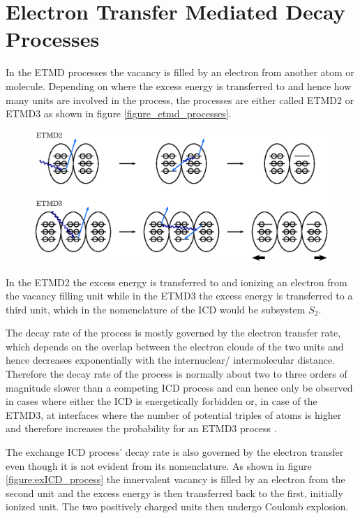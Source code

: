 \section{Electron Transfer Mediated Decay Processes}
In the \ac{ETMD} processes the vacancy is filled by an electron from another
atom or molecule. Depending on where the excess energy is transferred to and
hence how many units are involved in the process, the processes are either called
ETMD2 or ETMD3 as shown in figure \ref{figure_etmd_processes}.

\begin{figure}[h]
 \centering
 \includegraphics{pics/etmd-pspic.eps}
 \caption{}
 \label{figure:etmd_processes}
\end{figure}

In the ETMD2 the excess energy is transferred to and ionizing an electron
from the vacancy filling unit while in the ETMD3 the excess energy is transferred
to a third unit, which in the nomenclature of the ICD would be subsystem $S_2$.

The decay rate of the process is mostly governed by the electron transfer rate, which
depends on the overlap between the electron clouds of the two units and hence
decreases exponentially with the internuclear/ intermolecular distance. Therefore
the decay rate of the process is normally about two to three orders of magnitude slower
than a competing ICD process and can hence only be observed in cases where either
the ICD is energetically forbidden or, in case of the ETMD3, at interfaces
where the number of potential
triples of atoms is higher and therefore increases the probability for an ETMD3 process
\cite{Fasshauer13}.

The exchange ICD process' decay rate is also governed by the electron transfer
even though it is not evident from its nomenclature. As shown in
figure \ref{figure:exICD_process} the innervalent vacancy is filled by an electron
from the second unit and the excess energy is then transferred back to the first,
initially ionized unit. The two positively charged units then undergo Coulomb
explosion.

